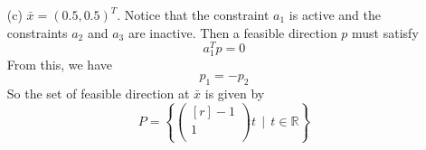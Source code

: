 \documentclass{article}
\begin{document}
\begin{itemize}
        \item[(c)] $\bar{x} = (0.5,0.5)^T$.
        \newline\newline
        Notice that the constraint $a_1$ is active and the constraints $a_2$ and $a_3$ are inactive. Then a feasible direction $p$ must satisfy
        \[a_1^Tp = 0\]
        From this, we have
        \[p_1 = -p_2\]
        So the set of feasible direction at $\bar{x}$ is given by
        \[P = \left\{\begin{pmatrix*}[r]
            -1\\
            1\\
        \end{pmatrix*}t \:\: \bigg| \:\: t\in \mathbb{R}\right\}\]
        
        
    \end{itemize}
\end{document}
